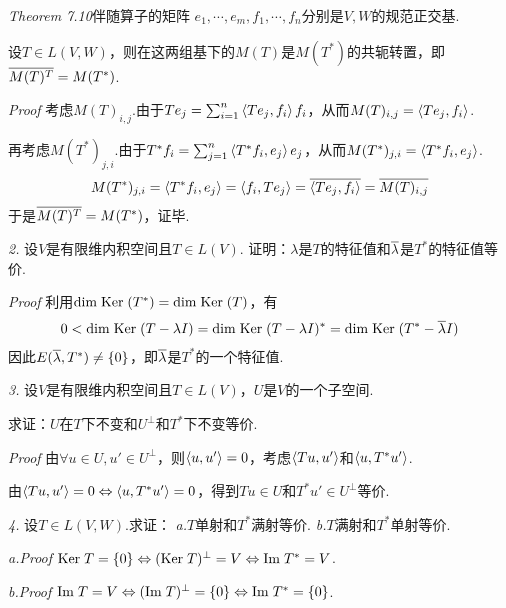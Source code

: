 \textit{Theorem 7.10}{\kaishu 伴随算子的矩阵}
\(e_1,\cdots,e_m,f_1,\cdots,f_n\)分别是\(V,W\)的规范正交基.

设\(T \in L(V,W)\)，则在这两组基下的\(M(T)\)是\(M(T^*)\)的共轭转置，即\(\overline{M(T)^T}=M(T^*)\).

\textit{Proof}
考虑\(M(T)_{i,j}\).由于\(Te_j=\sum_{i=1}^n \left\langle Te_j,f_i \right\rangle f_i\)，从而\(M(T)_{i,j}=\left\langle Te_j,f_i \right\rangle\).

再考虑\(M(T^*)_{j,i}\).由于\(T^*f_i=\sum_{j=1}^n \left\langle T^*f_i,e_j \right\rangle e_j\)，从而\(M(T^*)_{j,i}=\left\langle T^*f_i,e_j \right\rangle\).
    \begin{align*}
        M(T^*)_{j,i}=\left\langle T^*f_i,e_j \right\rangle=\left\langle f_i,Te_j \right\rangle=\overline{\left\langle Te_j,f_i \right\rangle}=\overline{M(T)_{i,j}}
    \end{align*}
于是\(\overline{M(T)^T}=M(T^*)\)，证毕.

\hspace*{\fill}

\textit{2.}
设\(V\)是有限维内积空间且\(T \in L(V)\).
证明：\(\lambda\)是\(T\)的特征值和\(\overline{\lambda}\)是\(T^*\)的特征值等价.

\textit{Proof}
利用\(\mathrm{dim \;} \mathrm{Ker \;}(T^*)=\mathrm{dim \;} \mathrm{Ker \;}(T)\)，有
    \begin{align*}
        0<\mathrm{dim \;} \mathrm{Ker \;}(T-\lambda I)=\mathrm{dim \;} \mathrm{Ker \;}(T-\lambda I)^*=\mathrm{dim \;} \mathrm{Ker \;}(T^*-\overline{\lambda}I)
    \end{align*}
因此\(E(\overline{\lambda},T^*) \ne \{0\}\)，即\(\overline{\lambda}\)是\(T^*\)的一个特征值.

\hspace*{\fill}

\textit{3.}
设\(V\)是有限维内积空间且\(T \in L(V)\)，\(U\)是\(V\)的一个子空间.

求证：\(U\)在\(T\)下不变和\(U^\bot\)和\(T^*\)下不变等价.

\textit{Proof}
由\(\forall u \in U,u' \in U^\bot\)，则\(\left\langle u,u' \right\rangle=0\)，考虑\(\left\langle Tu,u' \right\rangle\)和\(\left\langle u,T^*u' \right\rangle\).

由\(\left\langle Tu,u' \right\rangle=0 \Leftrightarrow \left\langle u,T^*u' \right\rangle=0\)，得到\(Tu \in U\)和\(T^*u' \in U^\bot\)等价.

\hspace*{\fill}

\textit{4.}
设\(T \in L(V,W)\).求证：
\textit{a.}\(T\)单射和\(T^*\)满射等价. \quad \textit{b.}\(T\)满射和\(T^*\)单射等价.

\textit{a.Proof}
\(\mathrm{Ker \;} T=\{0\} \Leftrightarrow (\mathrm{Ker \;} T)^\bot=V \Leftrightarrow \mathrm{Im \;} T^*=V\).

\textit{b.Proof}
\(\mathrm{Im \;} T=V \Leftrightarrow (\mathrm{Im \;} T)^\bot=\{0\} \Leftrightarrow \mathrm{Im \;} T^*=\{0\}\).

